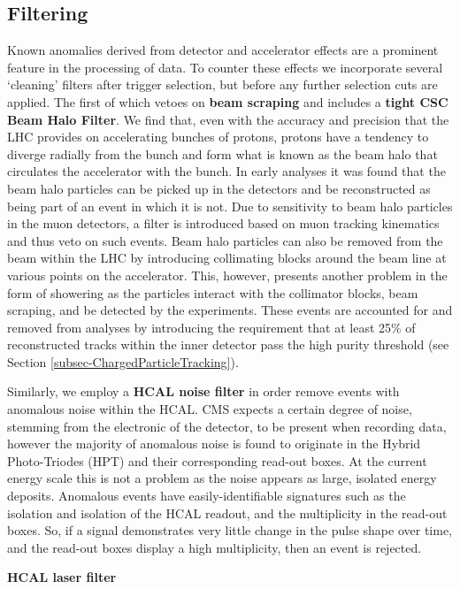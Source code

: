 \subsection{Filtering}

Known anomalies derived from detector and accelerator effects are a prominent feature in the processing of data. To counter these effects we incorporate several `cleaning' filters after trigger selection, but before any further selection cuts are applied. The first of which vetoes on \textbf{beam scraping} and includes a \textbf{tight CSC Beam Halo Filter}. We find that, even with the accuracy and precision that the LHC provides on accelerating bunches of protons, protons have a tendency to diverge radially from the bunch and form what is known as the beam halo that circulates the accelerator with the bunch. In early analyses it was found that the beam halo particles can be picked up in the detectors and be reconstructed as being part of an event in which it is not. Due to sensitivity to beam halo particles in the muon detectors, a filter is introduced based on muon tracking kinematics and thus veto on such events. Beam halo particles can also be removed from the beam within the LHC by introducing collimating blocks around the beam line at various points on the accelerator. This, however, presents another problem in the form of showering as the particles interact with the collimator blocks, beam scraping, and be detected by the experiments. These events are accounted for and removed from analyses by introducing the requirement that at least 25\% of reconstructed tracks within the inner detector pass the high purity threshold (see Section \ref{subsec-ChargedParticleTracking}). 

Similarly, we employ a \textbf{HCAL noise filter} in order remove events with anomalous noise within the HCAL. CMS expects a certain degree of noise, stemming from the electronic of the detector, to be present when recording data, however the majority of anomalous noise is found to originate in the Hybrid Photo-Triodes (HPT) and their corresponding read-out boxes. At the current energy scale this is not a problem as the noise appears as large, isolated energy deposits. Anomalous events have easily-identifiable signatures such as the isolation and isolation of the HCAL readout, and the multiplicity in the read-out boxes. So, if a signal demonstrates very little change in the pulse shape over time, and the read-out boxes display a high multiplicity, then an event is rejected.

\textbf{HCAL laser filter}


